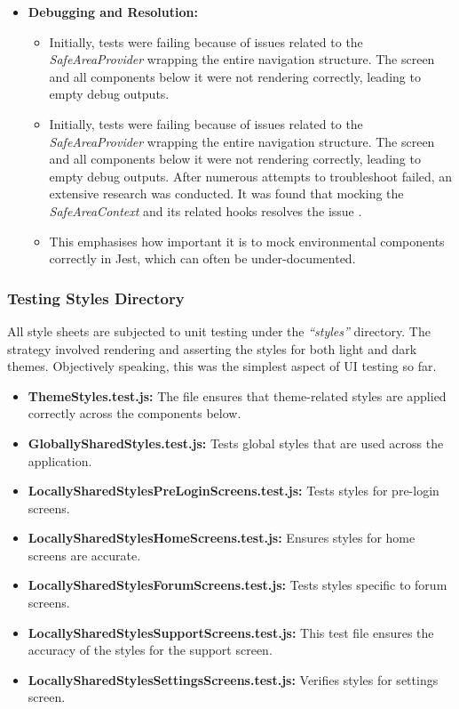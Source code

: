 \begin{itemize}
    \item \textbf{Debugging and Resolution:}
    \begin{itemize}
        \item Initially, tests were failing because of issues related to the \textit{SafeAreaProvider} wrapping the entire navigation structure. The screen and all components below it were not rendering correctly, leading to empty debug outputs.
        \item Initially, tests were failing because of issues related to the \textit{SafeAreaProvider} wrapping the entire navigation structure. The screen and all components below it were not rendering correctly, leading to empty debug outputs. After numerous attempts to troubleshoot failed, an extensive research was conducted. It was found that mocking the \textit{SafeAreaContext} and its related hooks resolves the issue \cite{StackOverflowSafeAreaContextIssue2021, GithubSafeAreaContextIssue2019}.
        \item This emphasises how important it is to mock environmental components correctly in Jest, which can often be under-documented.
    \end{itemize}
\end{itemize}

\subsubsection{Testing Styles Directory}

All style sheets are subjected to unit testing under the \textit{``styles''} directory. The strategy involved rendering and asserting the styles for both light and dark themes. Objectively speaking, this was the simplest aspect of UI testing so far.

\begin{itemize}
    \item \textbf{ThemeStyles.test.js:} The file ensures that theme-related styles are applied correctly across the components below.
    \item \textbf{GloballySharedStyles.test.js:} Tests global styles that are used across the application.
    \item \textbf{LocallySharedStylesPreLoginScreens.test.js:} Tests styles for pre-login screens.
    \item \textbf{LocallySharedStylesHomeScreens.test.js:} Ensures styles for home screens are accurate.
    \item \textbf{LocallySharedStylesForumScreens.test.js:} Tests styles specific to forum screens.
    \item \textbf{LocallySharedStylesSupportScreens.test.js:} This test file ensures the accuracy of the styles for the support screen.
    \item \textbf{LocallySharedStylesSettingsScreens.test.js:} Verifies styles for settings screen.
\end{itemize}

